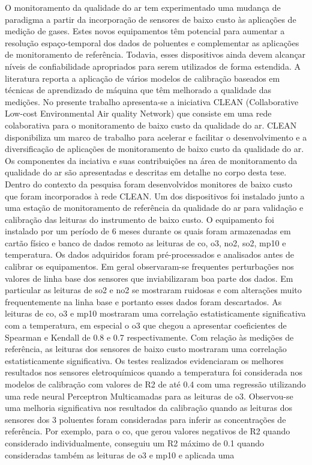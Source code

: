 \setlength{\absparsep}{18pt} %
\begin{resumo}
	\SingleSpacing
	O monitoramento da qualidade do ar tem experimentado uma mudança de paradigma a partir da incorporação de sensores de baixo custo às aplicações de medição de gases. Estes novos equipamentos têm potencial para aumentar a resolução espaço-temporal dos dados de poluentes e complementar as aplicações de monitoramento de referência. Todavia, esses dispositivos ainda devem alcançar níveis de confiabilidade apropriados para serem utilizados de forma estendida. A literatura reporta a aplicação de vários modelos de calibração baseados em técnicas de aprendizado de máquina que têm melhorado a qualidade das medições. No presente trabalho apresenta-se a iniciativa CLEAN (Collaborative Low-cost Environmental Air quality Network) que consiste em uma rede colaborativa para o monitoramento de baixo custo da qualidade do ar. CLEAN disponibiliza um marco de trabalho para acelerar e facilitar o desenvolvimento e a diversificação de aplicações de monitoramento de baixo custo da qualidade do ar. Os componentes da inciativa e suas contribuições na área de monitoramento da qualidade do ar são apresentadas e descritas em detalhe no corpo desta tese. Dentro do contexto da pesquisa foram desenvolvidos monitores de baixo custo que foram incorporados à rede CLEAN. Um dos dispositivos foi instalado junto a uma estação de monitoramento de referência da qualidade do ar para validação e calibração das leituras do instrumento de baixo custo. O equipamento foi instalado por um período de 6 meses durante os quais foram armazenadas em cartão físico e banco de dados remoto as leituras de \acrshort{co}, \acrshort{o3}, \acrshort{no2}, \acrshort{so2}, \acrshort{mp10} e temperatura. Os dados adquiridos foram pré-processados e analisados antes de calibrar os equipamentos. Em geral observaram-se frequentes perturbações nos valores de linha base dos sensores que inviabilizaram boa parte dos dados. Em particular as leituras de \acrshort{so2} e \acrshort{no2} se mostraram ruidosas e com alterações muito frequentemente na linha base e portanto esses dados foram descartados. As leituras de \acrshort{co}, \acrshort{o3} e \acrshort{mp10} mostraram uma correlação estatisticamente significativa com a temperatura, em especial o \acrshort{o3} que chegou a apresentar coeficientes de Spearman e Kendall de 0.8 e 0.7 respectivamente. Com relação às medições de referência, as leituras dos sensores de baixo custo mostraram uma correlação estatisticamente significativa. Os testes realizados evidenciaram os melhores resultados nos sensores eletroquímicos quando a temperatura foi considerada nos modelos de calibração com valores de R2 de até 0.4 com uma regressão utilizando uma rede neural Perceptron Multicamadas para as leituras de \acrshort{o3}. Observou-se uma melhoria significativa nos resultados da calibração quando as leituras dos sensores dos 3 poluentes foram consideradas para inferir as concentrações de referência. Por exemplo, para o \acrshort{co}, que gerou valores negativos de R2 quando considerado individualmente, conseguiu um R2 máximo de 0.1 quando consideradas também as leituras de \acrshort{o3} e \acrshort{mp10} e aplicada uma 
\end{resumo}
